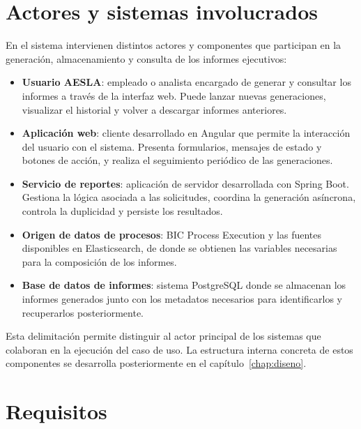 \documentclass[11pt,a4paper,titlepage,oneside]{report}
\begin{document}
\section{Actores y sistemas involucrados}

En el sistema intervienen distintos actores y componentes que participan en la
generación, almacenamiento y consulta de los informes ejecutivos:

\begin{itemize}

    \item \textbf{Usuario AESLA}: empleado o analista encargado de generar y
    consultar los informes a través de la interfaz web. Puede lanzar nuevas
    generaciones, visualizar el historial y volver a descargar informes
    anteriores.

    \item \textbf{Aplicación web}: cliente desarrollado en Angular que permite
    la interacción del usuario con el sistema. Presenta formularios, mensajes de
    estado y botones de acción, y realiza el seguimiento periódico de las
    generaciones.

    \item \textbf{Servicio de reportes}: aplicación de servidor desarrollada con
    Spring Boot. Gestiona la lógica asociada a las solicitudes, coordina la
    generación asíncrona, controla la duplicidad y persiste los resultados.

    \item \textbf{Origen de datos de procesos}: BIC Process Execution y las
    fuentes disponibles en Elasticsearch, de donde se obtienen las variables
    necesarias para la composición de los informes.

    \item \textbf{Base de datos de informes}: sistema PostgreSQL donde se
    almacenan los informes generados junto con los metadatos necesarios para
    identificarlos y recuperarlos posteriormente.

\end{itemize}

Esta delimitación permite distinguir al actor principal de los sistemas que
colaboran en la ejecución del caso de uso. La estructura interna concreta de
estos componentes se desarrolla posteriormente en el
capítulo~\ref{chap:diseno}.

\section{Requisitos}
\end{document}
